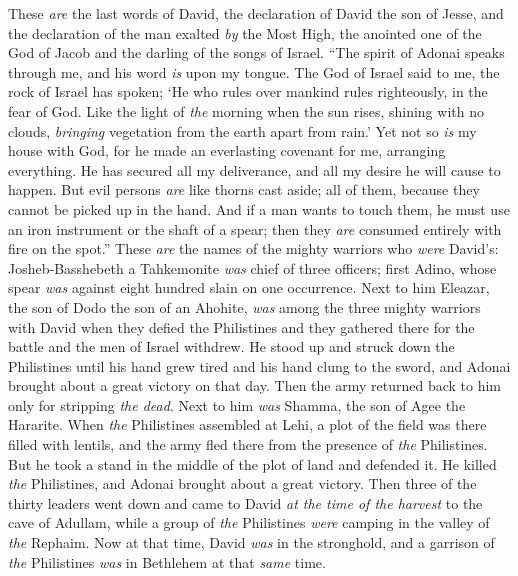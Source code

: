\begin{biblechapter} %
 These \textit{are} the last words of David, the declaration of David the son of Jesse, and the declaration of the man exalted \textit{by} the Most High, the anointed one of the God of Jacob and the darling of the songs of Israel.
\verse “The spirit of Adonai speaks through me, and his word \textit{is} upon my tongue.
\verse The God of Israel said to me, the rock of Israel has spoken; ‘He who rules over mankind rules righteously, in the fear of God.
\verse Like the light of \textit{the} morning when the sun rises, shining with no clouds, \textit{bringing} vegetation from the earth apart from rain.’
\verse Yet not so \textit{is} my house with God, for he made an everlasting covenant for me, arranging everything. He has secured all my deliverance, and all my desire he will cause to happen.
\verse But evil persons \textit{are} like thorns cast aside; all of them, because they cannot be picked up in the hand.
\verse And if a man wants to touch them, he must use an iron instrument or the shaft of a spear; then they \textit{are} consumed entirely with fire on the spot.”
 These \textit{are} the names of the mighty warriors who \textit{were} David’s: Josheb-Basshebeth a Tahkemonite \textit{was} chief of three officers; first Adino, whose spear \textit{was} against eight hundred slain on one occurrence.
\verse Next to him Eleazar, the son of Dodo the son of an Ahohite, \textit{was} among the three mighty warriors with David when they defied the Philistines and they gathered there for the battle and the men of Israel withdrew.
\verse He stood up and struck down the Philistines until his hand grew tired and his hand clung to the sword, and Adonai brought about a great victory on that day. Then the army returned back to him only for stripping \textit{the dead}.
\verse Next to him \textit{was} Shamma, the son of Agee the Hararite. When \textit{the} Philistines assembled at Lehi, a plot of the field was there filled with lentils, and the army fled there from the presence of \textit{the} Philistines.
\verse But he took a stand in the middle of the plot of land and defended it. He killed \textit{the} Philistines, and Adonai brought about a great victory.
\verse Then three of the thirty leaders went down and came to David \textit{at the time of the harvest} to the cave of Adullam, while a group of \textit{the} Philistines \textit{were} camping in the valley of \textit{the} Rephaim.
\verse Now at that time, David \textit{was} in the stronghold, and a garrison of \textit{the} Philistines \textit{was} in Bethlehem at that \textit{same} time.

\end{biblechapter}

